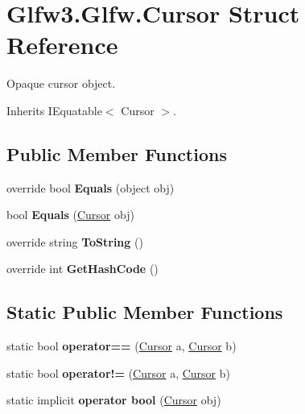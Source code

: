 \hypertarget{struct_glfw3_1_1_glfw_1_1_cursor}{}\section{Glfw3.\+Glfw.\+Cursor Struct Reference}
\label{struct_glfw3_1_1_glfw_1_1_cursor}


Opaque cursor object.  




Inherits I\+Equatable$<$ Cursor $>$.

\subsection*{Public Member Functions}
\begin{DoxyCompactItemize}
\item 
\mbox{\label{struct_glfw3_1_1_glfw_1_1_cursor_abdc3304db2d85d2812fff80ee6d7e845}} 
override bool {\bfseries Equals} (object obj)
\item 
\mbox{\label{struct_glfw3_1_1_glfw_1_1_cursor_af4b4b0e4ce88cd5219bc38cf5b11a847}} 
bool {\bfseries Equals} (\mbox{\hyperlink{struct_glfw3_1_1_glfw_1_1_cursor}{Cursor}} obj)
\item 
\mbox{\label{struct_glfw3_1_1_glfw_1_1_cursor_aa81dc4e90d7b4a96de6afe72e3588507}} 
override string {\bfseries To\+String} ()
\item 
\mbox{\label{struct_glfw3_1_1_glfw_1_1_cursor_a6ff8abae5c2658290b4817b76e9a65b3}} 
override int {\bfseries Get\+Hash\+Code} ()
\end{DoxyCompactItemize}
\subsection*{Static Public Member Functions}
\begin{DoxyCompactItemize}
\item 
\mbox{\label{struct_glfw3_1_1_glfw_1_1_cursor_a7aa3f20144ab9e8e96fee1def6b6a173}} 
static bool {\bfseries operator==} (\mbox{\hyperlink{struct_glfw3_1_1_glfw_1_1_cursor}{Cursor}} a, \mbox{\hyperlink{struct_glfw3_1_1_glfw_1_1_cursor}{Cursor}} b)
\item 
\mbox{\label{struct_glfw3_1_1_glfw_1_1_cursor_a5ab2899fb9ac66508fbd5283fe056cef}} 
static bool {\bfseries operator!=} (\mbox{\hyperlink{struct_glfw3_1_1_glfw_1_1_cursor}{Cursor}} a, \mbox{\hyperlink{struct_glfw3_1_1_glfw_1_1_cursor}{Cursor}} b)
\item 
\mbox{\label{struct_glfw3_1_1_glfw_1_1_cursor_a0213d606ed4fadf0cba4255c90541fac}} 
static implicit {\bfseries operator bool} (\mbox{\hyperlink{struct_glfw3_1_1_glfw_1_1_cursor}{Cursor}} obj)
\end{DoxyCompactItemize}
